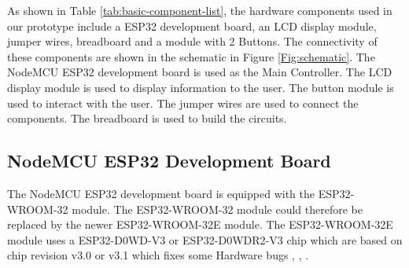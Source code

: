 As shown in Table \ref{tab:basic-component-list}, the hardware components used in our prototype include a ESP32 development board, an LCD display module, jumper wires, breadboard and a module with 2 Buttons. The connectivity of these components are shown in the schematic in Figure \ref{Fig:schematic}. The NodeMCU ESP32 development board is used as the Main Controller. The LCD display module is used to display information to the user. The button module is used to interact with the user. The jumper wires are used to connect the components. The breadboard is used to build the circuits.

\subsection{NodeMCU ESP32 Development Board}
The NodeMCU ESP32 development board is equipped with the ESP32-WROOM-32 module. The ESP32-WROOM-32 module could therefore be replaced by the newer ESP32-WROOM-32E module. The ESP32-WROOM-32E module uses a ESP32-D0WD-V3 or ESP32-D0WDR2-V3 chip which are based on chip revision v3.0 or v3.1 which fixes some Hardware bugs \cite[1]{esp32-module-new}, \cite[11]{esp32-series}, \cite[3-4]{esp32-errata}. 

